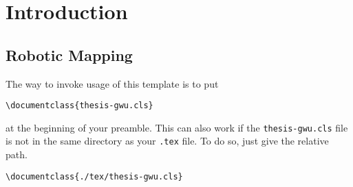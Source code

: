 
\chapter{Introduction} \label{chap:intro}

%
%


\section{Robotic Mapping}
The way to invoke usage of this template is to put
\begin{verbatim}
\documentclass{thesis-gwu.cls}
\end{verbatim}
at the beginning of your preamble.  
This can also work if the \texttt{thesis-gwu.cls} file is not in the same directory as your \texttt{.tex} file.  
To do so, just give the relative path.
\begin{verbatim}
\documentclass{./tex/thesis-gwu.cls}
\end{verbatim}


